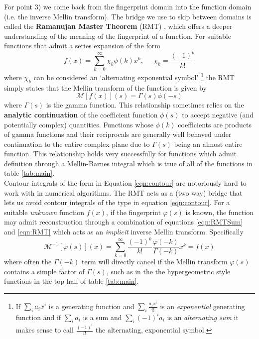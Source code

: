 \documentclass{article}
\begin{document}
For point 3) we come back from the fingerprint domain into the function domain (i.e. the inverse Mellin transform). The bridge we use to skip between domains is called the \textbf{Ramanujan Master Theorem} (RMT) \cite{Amdeberhan2012}, which offers a deeper understanding of the meaning of the fingerprint of a function. For suitable functions that admit a series expansion of the form
\begin{equation}
f(x) = \sum_{k=0}^\infty \chi_k \phi(k)x^k, \;\;\;\;\; \chi_k = \frac{(-1)^k}{k!}
\label{eqn:RMTSum}
\end{equation}
where $\chi_k$ can be considered an `alternating exponential symbol' \footnote{If $\sum_i a_ix^i$ is a generating function and $\sum_i \frac{a_ix^i}{i!}$ is an \emph{exponential} generating function and if $\sum_{i} a_i$ is a sum and $\sum_i (-1)^i a_i$ is an \emph{alternating sum} it makes sense to call $\frac{(-1)^i}{i!}$ the alternating, exponential symbol.} the RMT simply states that the Mellin transform of the function is given by
\begin{equation}
\mathcal{M}[f(x)](s) = \Gamma(s)\phi(-s)
\label{eqn:RMT}
\end{equation}
where $\Gamma(s)$ is the gamma function. This relationship sometimes relies on the \textbf{analytic continuation} of the coefficient function $\phi(s)$ to accept negative (and potentially complex) quantities. Functions whose $\phi(k)$ coefficients are products of gamma functions and their reciprocals are generally well behaved under continuation to the entire complex plane due to $\Gamma(s)$ being an almost entire function. This relationship holds very successfully for functions which admit definition through a Mellin-Barnes integral which is true of all of the functions in table \ref{tab:main}. \\

Contour integrals of the form in Equation \ref{eqn:contour} are notoriously hard to work with in numerical algorithms. The RMT acts as a (two way) bridge that lets us avoid contour integrals of the type in equation \ref{eqn:contour}. For a suitable \emph{unknown} function $f(x)$, if the fingerprint $\varphi(s)$ is known, the function may admit reconstruction through a combination of equations \ref{eqn:RMTSum} and \ref{eqn:RMT} which acts as an \emph{implicit} inverse Mellin transform. Specifically
\begin{equation}
\mathcal{M}^{-1}[\varphi(s)](x) = \sum_{k=0}^\infty \frac{(-1)^k}{k!}\frac{\varphi(-k)}{\Gamma(-k)}x^k = f(x)
\label{eqn:ImplicitInverseMellin}
\end{equation}
where often the $\Gamma(-k)$ term will directly cancel if the Mellin transform $\varphi(s)$ contains a simple factor of $\Gamma(s)$, such as in the the hypergeometric style functions in the top half of table \ref{tab:main}.
\end{document}
